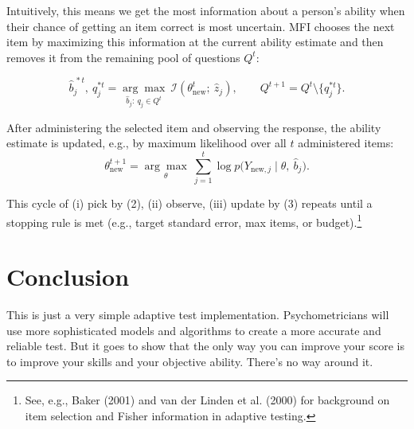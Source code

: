 \documentclass{article}
\begin{document}
Intuitively, this means we get the most information about a person's ability when their chance of getting an item correct is most uncertain. MFI chooses the next item by maximizing this information at the current ability estimate and then removes it from the remaining pool of questions $Q^t$:

\[
\hat b^{\,*t}_j,\ q^{*t}_j
= \underset{\hat b_j:\ q_j\in Q^t}{\arg\max}\ \mathcal I\!\left(\theta^{t}_{\text{new}};\ \hat z_j\right),
\qquad
Q^{t+1} = Q^t\setminus\{q^{*t}_j\}.
\tag{2}
\]

After administering the selected item and observing the response, the ability estimate is
updated, e.g., by maximum likelihood over all $t$ administered items:
\[
\theta^{t+1}_{\text{new}}
= \underset{\theta}{\arg\max}\ \sum_{j=1}^{t} \log p\big(Y_{\text{new},j}\mid \theta,\ \hat b_j\big).
\tag{3}
\]

This cycle of (i) pick by (2), (ii) observe, (iii) update by (3) repeats until a stopping
rule is met (e.g., target standard error, max items, or budget).\footnote{See, e.g.,
Baker (2001) and van der Linden et al. (2000) for background on item selection and Fisher
information in adaptive testing.}

\section*{Conclusion}

This is just a very simple adaptive test implementation. Psychometricians will use more sophisticated models and algorithms to create a more accurate and reliable test. But it goes to show that the only way you can improve your score is to improve your skills and your objective ability. There's no way around it.
\end{document}
